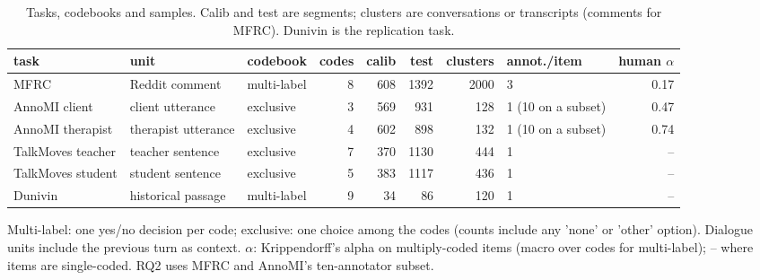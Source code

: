 \begin{table}[t]
\centering
\small
\caption{Tasks, codebooks and samples. Calib and test are segments; clusters are conversations or transcripts (comments for MFRC). Dunivin is the replication task.}
\label{tab:main_datasets}
\begin{adjustbox}{max width=\linewidth}
\begin{tabular}{lllrrrrlr}
\toprule
task & unit & codebook & codes & calib & test & clusters & annot./item & human $\alpha$ \\
\midrule
MFRC & Reddit comment & multi-label & 8 & 608 & 1392 & 2000 & 3 & 0.17 \\
AnnoMI client & client utterance & exclusive & 3 & 569 & 931 & 128 & 1 (10 on a subset) & 0.47 \\
AnnoMI therapist & therapist utterance & exclusive & 4 & 602 & 898 & 132 & 1 (10 on a subset) & 0.74 \\
TalkMoves teacher & teacher sentence & exclusive & 7 & 370 & 1130 & 444 & 1 & -- \\
TalkMoves student & student sentence & exclusive & 5 & 383 & 1117 & 436 & 1 & -- \\
Dunivin & historical passage & multi-label & 9 & 34 & 86 & 120 & 1 & -- \\
\bottomrule
\end{tabular}
\end{adjustbox}
\par\smallskip\footnotesize\raggedright Multi-label: one yes/no decision per code; exclusive: one choice among the codes (counts include any 'none' or 'other' option). Dialogue units include the previous turn as context. $\alpha$: Krippendorff's alpha on multiply-coded items (macro over codes for multi-label); -- where items are single-coded. RQ2 uses MFRC and AnnoMI's ten-annotator subset.
\end{table}
